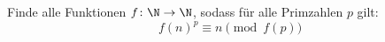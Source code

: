 Finde alle Funktionen $f\colon\N \rightarrow \N$, sodass für alle Primzahlen $p$ gilt: 
\[
f(n)^p \equiv n \pmod{f(p)}
\]
